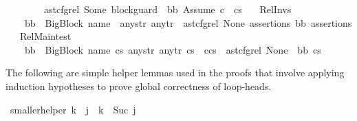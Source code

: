 \begin{isabellebody}
\ \ \ \ \ \ \ \ ast{\isacharunderscore}{\kern0pt}cfg{\isacharunderscore}{\kern0pt}rel\ {\isacharparenleft}{\kern0pt}Some\ block{\isacharunderscore}{\kern0pt}guard{\isacharparenright}{\kern0pt}\ {\isacharbrackleft}{\kern0pt}{\isacharbrackright}{\kern0pt}\ bb\ {\isacharparenleft}{\kern0pt}{\isacharparenleft}{\kern0pt}Assume\ c{\isacharparenright}{\kern0pt}\ {\isacharhash}{\kern0pt}\ cs{}{\isacharparenright}{\kern0pt}{\isachardoublequoteclose}\isanewline
\ \ {\isacharbar}{\kern0pt}\ Rel{\isacharunderscore}{\kern0pt}Invs{\isacharcolon}{\kern0pt}\isanewline
\ \ \ \ {\isachardoublequoteopen}{\isasymlbrakk}bb\ {\isacharequal}{\kern0pt}\ {\isacharparenleft}{\kern0pt}BigBlock\ name\ {\isacharbrackleft}{\kern0pt}{\isacharbrackright}{\kern0pt}\ any{\isacharunderscore}{\kern0pt}str\ any{\isacharunderscore}{\kern0pt}tr{\isacharparenright}{\kern0pt}{\isasymrbrakk}\ {\isasymLongrightarrow}\ ast{\isacharunderscore}{\kern0pt}cfg{\isacharunderscore}{\kern0pt}rel\ None\ assertions\ bb\ assertions{\isachardoublequoteclose}\isanewline
\ \ {\isacharbar}{\kern0pt}\ Rel{\isacharunderscore}{\kern0pt}Main{\isacharunderscore}{\kern0pt}test{\isacharcolon}{\kern0pt}\isanewline
\ \ \ \ {\isachardoublequoteopen}{\isasymlbrakk}bb\ {\isacharequal}{\kern0pt}\ {\isacharparenleft}{\kern0pt}BigBlock\ name\ cs{}\ any{\isacharunderscore}{\kern0pt}str\ any{\isacharunderscore}{\kern0pt}tr{\isacharparenright}{\kern0pt}{\isacharsemicolon}{\kern0pt}\ cs{}\ {\isacharequal}{\kern0pt}\ c{\isacharhash}{\kern0pt}cs{\isasymrbrakk}\ {\isasymLongrightarrow}\ ast{\isacharunderscore}{\kern0pt}cfg{\isacharunderscore}{\kern0pt}rel\ None\ {\isacharbrackleft}{\kern0pt}{\isacharbrackright}{\kern0pt}\ bb\ cs{}{\isachardoublequoteclose}%
\isadelimdocument
%
\endisadelimdocument
%
\isatagdocument
%
\isamarkuptrue%
%
\endisatagdocument
{\isafolddocument}%
%
\isadelimdocument
%
\endisadelimdocument
%
\begin{isamarkuptext}%
The following are simple helper lemmas used in the proofs that involve applying induction hypotheses to prove global correctness of loop-heads.%
\end{isamarkuptext}\isamarkuptrue%
\isamarkupfalse%
\ smaller{\isacharunderscore}{\kern0pt}helper{\isacharcolon}{\kern0pt}\ {\isachardoublequoteopen}k\ {\isacharless}{\kern0pt}\ j\ {\isasymLongrightarrow}\ k\ {\isacharless}{\kern0pt}\ {\isacharparenleft}{\kern0pt}Suc\ j{\isacharparenright}{\kern0pt}{\isachardoublequoteclose}\isanewline
%
\isadelimproof
\ \ %

\end{isabellebody}
